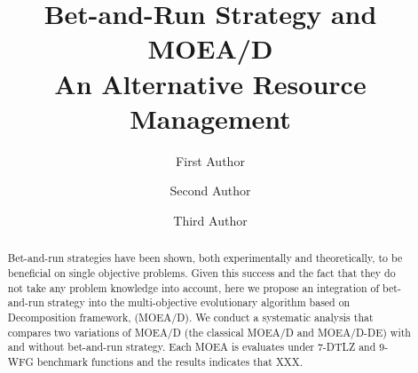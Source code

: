 \documentclass[runningheads]{llncs}
\begin{document}
%
\title{Bet-and-Run Strategy and MOEA/D \\ An Alternative Resource Management}
%
%
\author{First Author \and
Second Author \and
Third Author}
%
%
%
\maketitle              %
%
\begin{abstract}
Bet-and-run strategies have been shown, both experimentally and theoretically, to be beneficial on single objective problems. Given this success and the fact that they do not take any problem knowledge into account, here we propose an integration of bet-and-run strategy into the multi-objective evolutionary algorithm based on Decomposition framework, (MOEA/D). We conduct a systematic analysis that compares two variations of MOEA/D (the classical MOEA/D and MOEA/D-DE) with and without bet-and-run strategy.  Each MOEA is evaluates under 7-DTLZ and 9-WFG benchmark functions and the results indicates that XXX.

\end{abstract}
%
%
%

 






 
\end{document}
